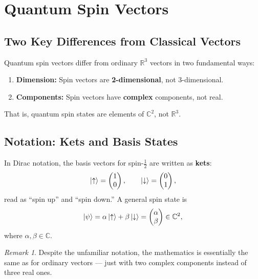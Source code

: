 \documentclass[11pt,a4paper]{article}
\theoremstyle{definition}
\theoremstyle{plain}
\theoremstyle{remark}
\newtheorem{remark}{Remark}[section]
\begin{document}
\section{Quantum Spin Vectors}

\subsection{Two Key Differences from Classical Vectors}

Quantum spin vectors differ from ordinary $\mathbb{R}^3$ vectors in two fundamental ways:
\begin{enumerate}[label=\textbf{\arabic*.}]
    \item \textbf{Dimension:} Spin vectors are \textbf{2-dimensional}, not 3-dimensional.
    \item \textbf{Components:} Spin vectors have \textbf{complex} components, not real.
\end{enumerate}

That is, quantum spin states are elements of $\mathbb{C}^2$, not $\mathbb{R}^3$.

\subsection{Notation: Kets and Basis States}

In Dirac notation, the basis vectors for spin-$\frac{1}{2}$ are written as \textbf{kets}:
\[
    \ket{\uparrow} = \begin{pmatrix} 1 \\ 0 \end{pmatrix}, \qquad
    \ket{\downarrow} = \begin{pmatrix} 0 \\ 1 \end{pmatrix},
\]
read as ``spin up'' and ``spin down.'' A general spin state is
\[
    \ket{\psi} = \alpha\ket{\uparrow} + \beta\ket{\downarrow} = \begin{pmatrix} \alpha \\ \beta \end{pmatrix} \in \mathbb{C}^2,
\]
where $\alpha, \beta \in \mathbb{C}$.

\begin{remark}
    Despite the unfamiliar notation, the mathematics is essentially the same as for ordinary vectors --- just with two complex components instead of three real ones.
\end{remark}
\end{document}
